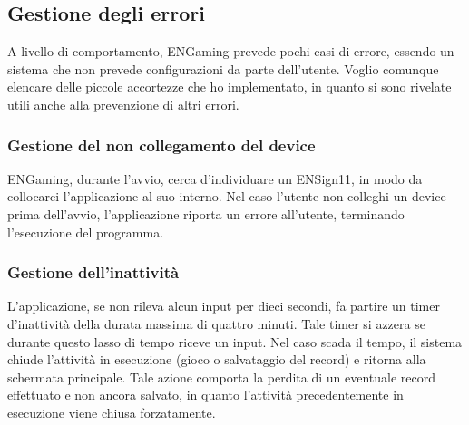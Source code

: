 \subsection{Gestione degli errori}
A livello di comportamento, ENGaming prevede pochi casi di errore, essendo un sistema che non prevede configurazioni da parte dell'utente.
Voglio comunque elencare delle piccole accortezze che ho implementato, in quanto si sono rivelate utili anche alla prevenzione di altri errori.
\subsubsection{Gestione del non collegamento del device}
ENGaming, durante l'avvio, cerca d'individuare un ENSign11, in modo da collocarci l'applicazione al suo interno. Nel caso l'utente non colleghi un device prima dell'avvio, l'applicazione riporta un errore all'utente, terminando l'esecuzione del programma.
\subsubsection{Gestione dell'inattività}
\label{sec:inactivity}
L'applicazione, se non rileva alcun input per dieci secondi, fa partire un timer d'inattività della durata massima di quattro minuti. Tale timer si azzera se durante questo lasso di tempo riceve un input.
Nel caso scada il tempo, il sistema chiude l'attività in esecuzione (gioco o salvataggio del record) e ritorna alla schermata principale.
Tale azione comporta la perdita di un eventuale record effettuato e non ancora salvato, in quanto l'attività precedentemente in esecuzione viene chiusa forzatamente.